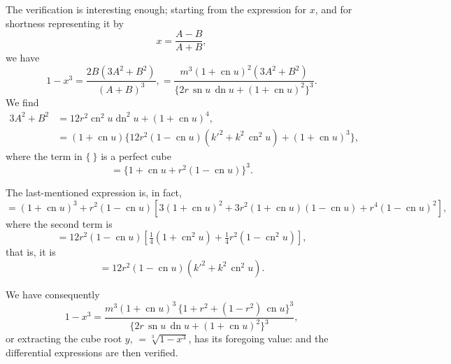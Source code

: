 \documentclass[11pt,a4paper]{article}
\theoremstyle{plain}
\theoremstyle{definition}
\theoremstyle{remark}
\begin{document}
The verification is interesting enough; starting from the expression for $x$, and for shortness representing it by
\[
x = \frac{A-B}{A+B},
\]
we have
\[
1-x^3 = \frac{2B(3A^2+B^2)}{(A+B)^3},
= \frac{m^3(1+\operatorname{cn} u)^2 (3A^2+B^2)}{\{2r\,\operatorname{sn} u\,\operatorname{dn} u + (1+\operatorname{cn} u)^2\}^3}.
\]
We find
\begin{align*}
3A^2 + B^2 &= 12r^2 \operatorname{cn}^2 u \operatorname{dn}^2 u + (1+\operatorname{cn} u)^4,\\
&= (1+\operatorname{cn} u)\{12r^2(1-\operatorname{cn} u)(k'^2 + k^2\,\operatorname{cn}^2 u) + (1+\operatorname{cn} u)^3\},
\end{align*}
where the term in $\{\ \}$ is a perfect cube
\[
= \{1 + \operatorname{cn} u + r^2(1-\operatorname{cn} u)\}^3.
\]

The last-mentioned expression is, in fact,
\[
= (1+\operatorname{cn} u)^3 + r^2(1-\operatorname{cn} u)[3(1+\operatorname{cn} u)^2 + 3r^2(1+\operatorname{cn} u)(1-\operatorname{cn} u) + r^4(1-\operatorname{cn} u)^2],
\]
where the second term is
\[
= 12r^2(1-\operatorname{cn} u)[\tfrac{1}{4}(1+\operatorname{cn}^2 u) + \tfrac{1}{4}r^2(1-\operatorname{cn}^2 u)],
\]
that is, it is
\[
= 12r^2(1-\operatorname{cn} u)(k'^2 + k^2\,\operatorname{cn}^2 u).
\]

We have consequently
\[
1-x^3 = \frac{m^3(1+\operatorname{cn} u)^3\,\{1+r^2+(1-r^2)\,\operatorname{cn} u\}^3}{\{2r\,\operatorname{sn} u\,\operatorname{dn} u + (1+\operatorname{cn} u)^2\}^3},
\]
or extracting the cube root $y$, $= \sqrt[3]{1-x^3}$, has its foregoing value: and the differential expressions are then verified.
\end{document}

